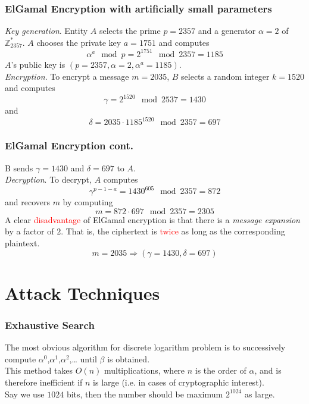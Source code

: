 \documentclass[hyperref=true]{beamer}
\begin{document}
\begin{frame}
  \frametitle{ElGamal Encryption with artificially small parameters}
\emph{Key generation}. Entity $A$ selects the prime $p=2357$ and a
generator $\alpha=2$ of $\mathbb{Z}_{2357}^{*}$. $A$ chooses the
private key $a=1751$ and computes
\begin{equation}
  \label{eq:elgamal-encryption-1}
  \alpha^{a}\mod p=2^{1751}\mod 2357=1185
\end{equation}
$A$'s public key is $(p=2357,\alpha=2,\alpha^{a}=1185)$.\\
\emph{Encryption}. To encrypt a message $m=2035$, $B$ selects a random
integer $k=1520$ and computes 
\begin{equation}
  \label{eq:elgamal-encryption-2}
  \gamma=2^{1520}\mod 2537=1430
\end{equation}
and
\begin{equation}
  \label{eq:elgamal-encryption-3}
  \delta=2035\cdot 1185^{1520}\mod 2357=697
\end{equation}
\end{frame}

\begin{frame}
  \frametitle{ElGamal Encryption cont.}
  B sends $\gamma=1430$ and $\delta=697$ to $A$.\\
\emph{Decryption}. To decrypt, $A$ computes
\begin{equation}
  \label{eq:elgamal-encryption-4}
  \gamma^{p-1-a}=1430^{605}\mod 2357=872
\end{equation}
and recovers $m$ by computing 
\begin{equation}
  \label{eq:elgamal-encryption-5}
  m=872\cdot 697\mod 2357=2305
\end{equation}
A clear \textcolor{red}{disadvantage} of ElGamal encryption is that
there is a \emph{message expansion} by a factor of $2$. That is, the
ciphertext is \textcolor{red}{twice} as long as the corresponding
plaintext.
\begin{equation}
  \label{eq:elgamal-encryption-6}
  m=2035\Rightarrow (\gamma=1430,\delta=697)
\end{equation}
\end{frame}




\section{Attack Techniques}
\begin{frame}
  \frametitle{Exhaustive Search}
The most obvious algorithm for discrete logarithm problem is to
successively compute $\alpha^{0}$,$\alpha^{1}$,$\alpha^{2}$,\ldots
until $\beta$ is obtained.\\[8pt]
This method takes $O(n)$ multiplications, where $n$ is the order of
$\alpha$, and is therefore inefficient if $n$ is large (i.e. in cases
of cryptographic interest).\\[8pt]
Say we use $1024$ bits, then the number should be maximum $2^{1024}$
as large.
\end{frame}
\end{document}
